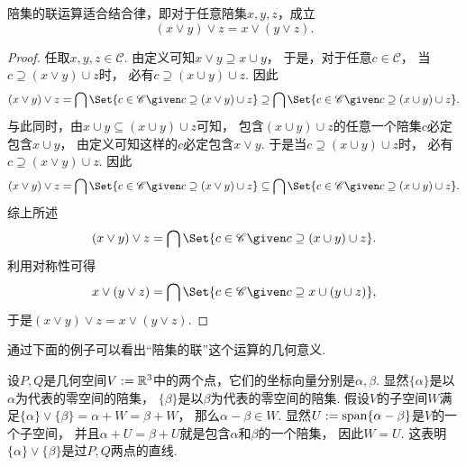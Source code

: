 \begin{property}
陪集的联运算适合结合律，即对于任意陪集\(x,y,z\)，成立\begin{equation}
	(x \vee y) \vee z = x \vee (y \vee z).
\end{equation}
\begin{proof}
任取\(x,y,z \in \mathscr{C}\).
由定义可知\(
	x \vee y
	\supseteq
	x \cup y
\)，
于是，对于任意\(c \in \mathscr{C}\)，
当\(c \supseteq (x \vee y) \cup z\)时，
必有\(c \supseteq (x \cup y) \cup z\).
因此\begin{equation*}
	(x \vee y) \vee z
	= \bigcap\Set{
		c \in \mathscr{C}
		\given
		c \supseteq (x \vee y) \cup z
	}
	\supseteq
	\bigcap\Set{
		c \in \mathscr{C}
		\given
		c \supseteq (x \cup y) \cup z
	}.
\end{equation*}
与此同时，由\(x \cup y \subseteq (x \cup y) \cup z\)可知，
包含\((x \cup y) \cup z\)的任意一个陪集\(c\)必定包含\(x \cup y\)，
由定义可知这样的\(c\)必定包含\(x \vee y\).
于是当\(c \supseteq (x \cup y) \cup z\)时，
必有\(c \supseteq (x \vee y) \cup z\).
因此\begin{equation*}
	(x \vee y) \vee z
	= \bigcap\Set{
		c \in \mathscr{C}
		\given
		c \supseteq (x \vee y) \cup z
	}
	\subseteq
	\bigcap\Set{
		c \in \mathscr{C}
		\given
		c \supseteq (x \cup y) \cup z
	}.
\end{equation*}
综上所述\begin{equation*}
	(x \vee y) \vee z
	= \bigcap\Set{
		c \in \mathscr{C}
		\given
		c \supseteq (x \cup y) \cup z
	}.
\end{equation*}
利用对称性可得\begin{equation*}
	x \vee (y \vee z)
	= \bigcap\Set{
		c \in \mathscr{C}
		\given
		c \supseteq x \cup (y \cup z)
	},
\end{equation*}
于是\((x \vee y) \vee z = x \vee (y \vee z)\).
\end{proof}
\end{property}

通过下面的例子可以看出“陪集的联”这个运算的几何意义.
\begin{example}
设\(P,Q\)是几何空间\(V := \mathbb{R}^3\)中的两个点，它们的坐标向量分别是\(\alpha,\beta\).
显然\(\{\alpha\}\)是以\(\alpha\)为代表的零空间的陪集，
\(\{\beta\}\)是以\(\beta\)为代表的零空间的陪集.
假设\(V\)的子空间\(W\)满足\(
	\{\alpha\} \vee \{\beta\}
	= \alpha + W
	= \beta + W
\)，
那么\(\alpha - \beta \in W\).
显然\(U := \operatorname{span}\{\alpha - \beta\}\)是\(V\)的一个子空间，
并且\(\alpha + U = \beta + U\)就是包含\(\alpha\)和\(\beta\)的一个陪集，
因此\(W = U\).
这表明\(\{\alpha\} \vee \{\beta\}\)是过\(P,Q\)两点的直线.
\end{example}

